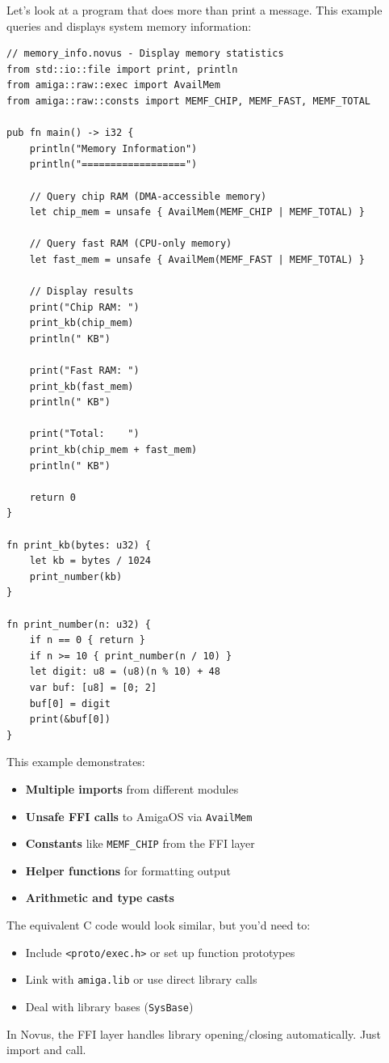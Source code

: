 Let's look at a program that does more than print a message. This example queries and displays system memory information:

\begin{lstlisting}
// memory_info.novus - Display memory statistics
from std::io::file import print, println
from amiga::raw::exec import AvailMem
from amiga::raw::consts import MEMF_CHIP, MEMF_FAST, MEMF_TOTAL

pub fn main() -> i32 {
    println("Memory Information")
    println("==================")

    // Query chip RAM (DMA-accessible memory)
    let chip_mem = unsafe { AvailMem(MEMF_CHIP | MEMF_TOTAL) }

    // Query fast RAM (CPU-only memory)
    let fast_mem = unsafe { AvailMem(MEMF_FAST | MEMF_TOTAL) }

    // Display results
    print("Chip RAM: ")
    print_kb(chip_mem)
    println(" KB")

    print("Fast RAM: ")
    print_kb(fast_mem)
    println(" KB")

    print("Total:    ")
    print_kb(chip_mem + fast_mem)
    println(" KB")

    return 0
}

fn print_kb(bytes: u32) {
    let kb = bytes / 1024
    print_number(kb)
}

fn print_number(n: u32) {
    if n == 0 { return }
    if n >= 10 { print_number(n / 10) }
    let digit: u8 = (u8)(n % 10) + 48
    var buf: [u8] = [0; 2]
    buf[0] = digit
    print(&buf[0])
}
\end{lstlisting}

This example demonstrates:
\begin{itemize}
    \item \textbf{Multiple imports} from different modules
    \item \textbf{Unsafe FFI calls} to AmigaOS via \texttt{AvailMem}
    \item \textbf{Constants} like \texttt{MEMF\_CHIP} from the FFI layer
    \item \textbf{Helper functions} for formatting output
    \item \textbf{Arithmetic and type casts}
\end{itemize}

\begin{comingfromc}
The equivalent C code would look similar, but you'd need to:
\begin{itemize}
    \item Include \texttt{<proto/exec.h>} or set up function prototypes
    \item Link with \texttt{amiga.lib} or use direct library calls
    \item Deal with library bases (\texttt{SysBase})
\end{itemize}

In Novus, the FFI layer handles library opening/closing automatically. Just import and call.
\end{comingfromc}

